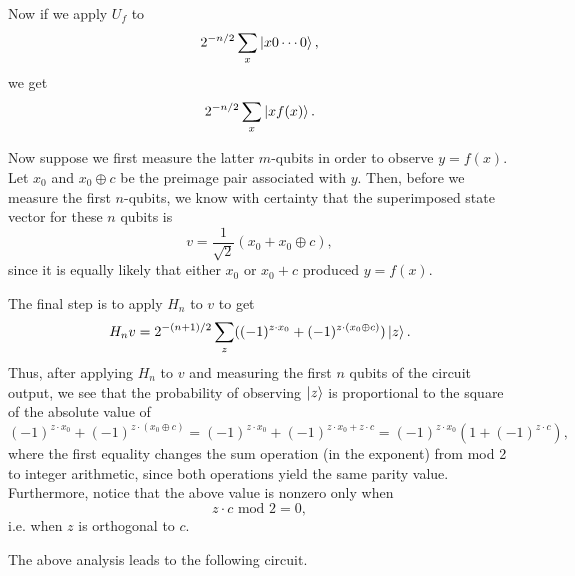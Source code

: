 \documentclass [12pt]{article}
\theoremstyle{definition}
\begin{document}
\newpage
 Now if we apply $U_f$ to 
\[2^{-n/2}\sum_{x}\ket{x0\cdots 0},\]
we get
\[2^{-n/2}\sum_{x}\ket{xf(x)}.\]

Now suppose we first measure the latter $m$-qubits in order to observe $y = f(x)$.
Let $x_0$ and $x_0\oplus c$ be the preimage pair associated with $y$. Then, before we measure the first $n$-qubits, we know with certainty that
the superimposed state vector for these $n$ qubits is 
\[v = \frac{1}{\sqrt{2}}(x_0 + x_0\oplus c),\]
since it is equally likely that either $x_0$ or $x_0+c$  produced $y=f(x)$.

The final step is to apply $H_n$ to $v$ to get
\[H_nv=2^{-(n+1)/2}\sum_z ((-1)^{z\cdot x_0} + (-1)^{z\cdot(x_0\oplus c)})\ket{z} .\]
Thus, after applying $H_n$ to $v$ and measuring the first $n$ qubits of the circuit output, we see that the probability of observing $\ket{z}$ is 
proportional to the square of the absolute value of
\[(-1)^{z\cdot x_0} + (-1)^{z\cdot(x_0\oplus c)} = (-1)^{z\cdot x_0} + (-1)^{z\cdot x_0 + z\cdot c} = (-1)^{z\cdot x_0}(1+(-1)^{z\cdot c}),\]
where the first equality changes the sum operation (in the exponent) from mod 2 to integer arithmetic, since both operations yield the same parity value. 
 Furthermore, notice that the 
above value is nonzero only when 
\[z\cdot c\mbox{ mod }2=0,\]
 i.e. when $z$ is orthogonal to $c$.

The above analysis leads to the following circuit.


\begin{center}
\end{center}
\end{document}
